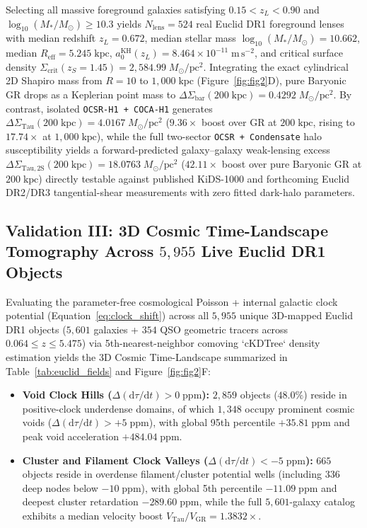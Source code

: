 \documentclass[11pt,a4paper]{article}
\begin{document}
Selecting all massive foreground galaxies satisfying $0.15 < z_L < 0.90$ and $\log_{10}(M_*/M_\odot) \ge 10.3$ yields $N_{\mathrm{lens}} = 524$ real Euclid DR1 foreground lenses with median redshift $z_L = 0.672$, median stellar mass $\log_{10}(M_*/M_\odot) = 10.662$, median $R_{\mathrm{eff}} = 5.245\;\mathrm{kpc}$, $a_0^{\mathrm{KH}}(z_L) = 8.464\times 10^{-11}\;\mathrm{m\,s^{-2}}$, and critical surface density $\Sigma_{\mathrm{crit}}(z_S=1.45) = 2,584.99\;M_\odot/\mathrm{pc}^2$. Integrating the exact cylindrical 2D Shapiro mass from $R = 10$ to $1,000\;\mathrm{kpc}$ (Figure~\ref{fig:fig2}D), pure Baryonic GR drops as a Keplerian point mass to $\Delta\Sigma_{\mathrm{bar}}(200\;\mathrm{kpc}) = 0.4292\;M_\odot/\mathrm{pc}^2$. By contrast, isolated \texttt{OCSR-H1 + COCA-H1} generates $\Delta\Sigma_{\mathrm{Tau}}(200\;\mathrm{kpc}) = 4.0167\;M_\odot/\mathrm{pc}^2$ ($9.36\times$ boost over GR at $200\;\mathrm{kpc}$, rising to $17.74\times$ at $1,000\;\mathrm{kpc}$), while the full two-sector \texttt{OCSR + Condensate} halo susceptibility yields a forward-predicted galaxy--galaxy weak-lensing excess $\Delta\Sigma_{\mathrm{Tau,2S}}(200\;\mathrm{kpc}) = 18.0763\;M_\odot/\mathrm{pc}^2$ ($42.11\times$ boost over pure Baryonic GR at $200\;\mathrm{kpc}$) directly testable against published KiDS-1000 \cite{Brouwer2021KiDSWL} and forthcoming Euclid DR2/DR3 tangential-shear measurements with zero fitted dark-halo parameters.

\subsection{Validation III: 3D Cosmic Time-Landscape Tomography Across \texorpdfstring{$5,955$}{5,955} Live Euclid DR1 Objects}

Evaluating the parameter-free cosmological Poisson + internal galactic clock potential (Equation~\ref{eq:clock_shift}) across all $5,955$ unique 3D-mapped Euclid DR1 objects ($5,601$ galaxies + $354$ QSO geometric tracers across $0.064 \le z \le 5.475$) via 5th-nearest-neighbor comoving `cKDTree` density estimation yields the 3D Cosmic Time-Landscape summarized in Table~\ref{tab:euclid_fields} and Figure~\ref{fig:fig2}F:
\begin{itemize}
  \item \textbf{Void Clock Hills ($\Delta(\mathrm{d}\tau/\mathrm{d}t) > 0\;\mathrm{ppm}$):} $2,859$ objects ($48.0\%$) reside in positive-clock underdense domains, of which $1,348$ occupy prominent cosmic voids ($\Delta(\mathrm{d}\tau/\mathrm{d}t) > +5\;\mathrm{ppm}$), with global 95th percentile $+35.81\;\mathrm{ppm}$ and peak void acceleration $+484.04\;\mathrm{ppm}$.
  \item \textbf{Cluster and Filament Clock Valleys ($\Delta(\mathrm{d}\tau/\mathrm{d}t) < -5\;\mathrm{ppm}$):} $665$ objects reside in overdense filament/cluster potential wells (including $336$ deep nodes below $-10\;\mathrm{ppm}$), with global 5th percentile $-11.09\;\mathrm{ppm}$ and deepest cluster retardation $-289.60\;\mathrm{ppm}$, while the full $5,601$-galaxy catalog exhibits a median velocity boost $V_{\mathrm{Tau}}/V_{\mathrm{GR}} = 1.3832\times$.
\end{itemize}
\end{document}
